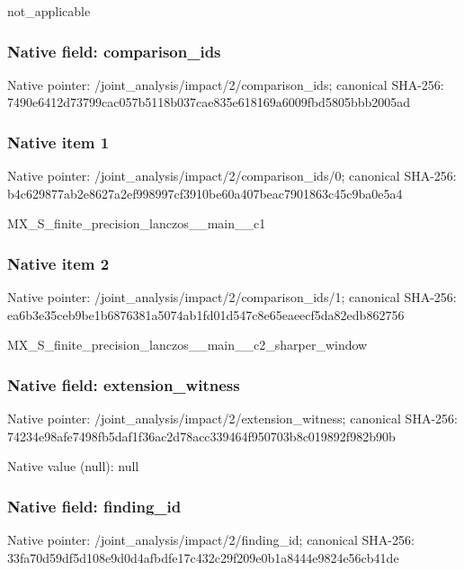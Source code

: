 \documentclass[10pt,a4paper]{article}
\begin{document}
\begingroup\raggedright\sloppy not\_\allowbreak{}applicable\par\endgroup

\subsubsection{Native field: comparison\_\allowbreak{}ids}
Native pointer: /joint\_\allowbreak{}analysis/impact/2/comparison\_\allowbreak{}ids; canonical SHA-256: 7490e6412d73799cac057b5118b037cae835e618169a6009fbd5805bbb2005ad

\subsubsection{Native item 1}
Native pointer: /joint\_\allowbreak{}analysis/impact/2/comparison\_\allowbreak{}ids/0; canonical SHA-256: b4c629877ab2e8627a2ef998997cf3910be60a407beac7901863c45c9ba0e5a4

\begingroup\raggedright\sloppy MX\_\allowbreak{}S\_\allowbreak{}finite\_\allowbreak{}precision\_\allowbreak{}lanczos\_\allowbreak{}\_\allowbreak{}main\_\allowbreak{}\_\allowbreak{}c1\par\endgroup

\subsubsection{Native item 2}
Native pointer: /joint\_\allowbreak{}analysis/impact/2/comparison\_\allowbreak{}ids/1; canonical SHA-256: ea6b3e35ceb9be1b6876381a5074ab1fd01d547c8e65eaeecf5da82edb862756

\begingroup\raggedright\sloppy MX\_\allowbreak{}S\_\allowbreak{}finite\_\allowbreak{}precision\_\allowbreak{}lanczos\_\allowbreak{}\_\allowbreak{}main\_\allowbreak{}\_\allowbreak{}c2\_\allowbreak{}sharper\_\allowbreak{}window\par\endgroup

\subsubsection{Native field: extension\_\allowbreak{}witness}
Native pointer: /joint\_\allowbreak{}analysis/impact/2/extension\_\allowbreak{}witness; canonical SHA-256: 74234e98afe7498fb5daf1f36ac2d78acc339464f950703b8c019892f982b90b

Native value (null): null

\subsubsection{Native field: finding\_\allowbreak{}id}
Native pointer: /joint\_\allowbreak{}analysis/impact/2/finding\_\allowbreak{}id; canonical SHA-256: 33fa70d59df5d108e9d0d4afbdfe17c432c29f209e0b1a8444e9824e56cb41de
\end{document}
